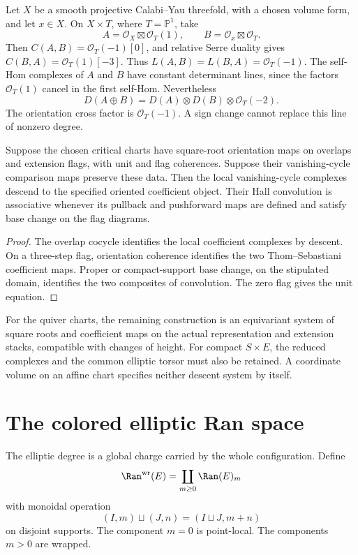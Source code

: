 \begin{example}
Let \(X\) be a smooth projective Calabi--Yau threefold, with a
chosen volume form, and let \(x\in X\). On
\(X\times T\), where \(T=\mathbb P^1\), take
\[
 A=\mathcal O_X\boxtimes\mathcal O_T(1),\qquad
 B=\mathcal O_x\boxtimes\mathcal O_T.
\]
Then \(C(A,B)=\mathcal O_T(-1)[0]\), and relative Serre
duality gives \(C(B,A)=\mathcal O_T(1)[-3]\).
Thus \(L(A,B)=L(B,A)=\mathcal O_T(-1)\).
The self-Hom complexes of \(A\) and \(B\) have constant
determinant lines, since the factors \(\mathcal O_T(1)\)
cancel in the first self-Hom. Nevertheless
\[
 D(A\oplus B)=D(A)\otimes D(B)\otimes\mathcal O_T(-2).
\]
The orientation cross factor is \(\mathcal O_T(-1)\).
A sign change cannot replace this line of nonzero degree.
\end{example}

\begin{corollary}
Suppose the chosen critical charts have square-root orientation
maps on overlaps and extension flags, with unit and flag coherences.
Suppose their vanishing-cycle comparison maps preserve these data.
Then the local vanishing-cycle complexes descend to the specified
oriented coefficient object. Their Hall convolution is associative
whenever its pullback and pushforward maps are defined and satisfy
base change on the flag diagrams.
\end{corollary}
\begin{proof}
The overlap cocycle identifies the local coefficient complexes by
descent. On a three-step flag, orientation coherence identifies
the two Thom--Sebastiani coefficient maps. Proper or compact-support
base change, on the stipulated domain, identifies the two composites
of convolution. The zero flag gives the unit equation.
\end{proof}

For the quiver charts, the remaining construction is an equivariant
system of square roots and coefficient maps on the actual
representation and extension stacks, compatible with changes of
height. For compact \(S\times E\), the reduced complexes and
the common elliptic torsor must also be retained. A coordinate
volume on an affine chart specifies neither descent system by itself.

\chapter{The colored elliptic Ran space}
The elliptic degree is a global charge carried by the whole configuration.  Define
\[
 \Ran^{\mathrm{wr}}(E)=\coprod_{m\ge0}\Ran(E)_m
\]
with monoidal operation
\[
 (I,m)\sqcup(J,n)=(I\sqcup J,m+n)
\]
on disjoint supports.  The component $m=0$ is point-local.  The components $m>0$ are wrapped.

